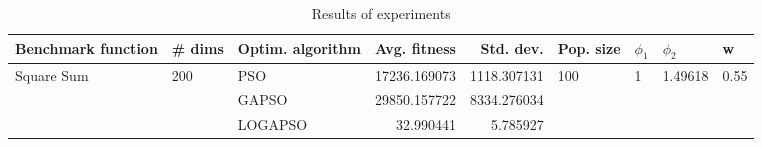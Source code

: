 \begin{table}
\centering
\caption{Results of experiments}
\begin{tabular}{lllrrllll}
\toprule
         Benchmark function &              \# dims & Optim. algorithm &  Avg. fitness &   Std. dev. &            Pop. size &         $\phi_{1}$ &               $\phi_{2}$ &                     w \\
\midrule
\multirow{3}{*}{Square Sum} & \multirow{3}{*}{200} &              PSO &  17236.169073 & 1118.307131 & \multirow{3}{*}{100} & \multirow{3}{*}{1} & \multirow{3}{*}{1.49618} & \multirow{3}{*}{0.55} \\
                            &                      &            GAPSO &  29850.157722 & 8334.276034 &                      &                    &                          &                       \\
                            &                      &          LOGAPSO &     32.990441 &    5.785927 &                      &                    &                          &                       \\
\bottomrule
\end{tabular}
\end{table}
